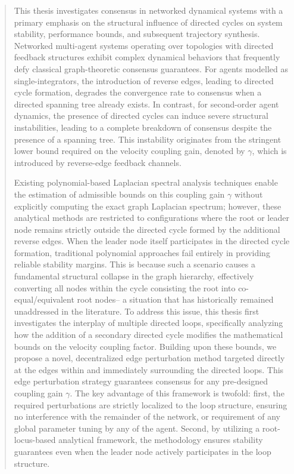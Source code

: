 \makedeclaration
\copyrightpage
\begin{abstract}
\raggedbottom
This thesis investigates consensus in networked dynamical systems with a primary emphasis on the structural influence of directed cycles on system stability, performance bounds, and subsequent trajectory synthesis. Networked multi-agent systems operating over topologies with directed feedback structures exhibit complex dynamical behaviors that frequently defy classical graph-theoretic consensus guarantees. For agents modelled as single-integrators, the introduction of reverse edges, leading to directed cycle formation, degrades the convergence rate to consensus when a directed spanning tree already exists. In contrast, for second-order agent dynamics, the presence of directed cycles can induce severe structural instabilities, leading to a complete breakdown of consensus despite the presence of a spanning tree. This instability originates from the stringent lower bound required on the velocity coupling gain, denoted by $\gamma$, which is introduced by reverse-edge feedback channels.

Existing polynomial-based Laplacian spectral analysis techniques enable the estimation of admissible bounds on this coupling gain $\gamma$ without explicitly computing the exact graph Laplacian spectrum; however, these analytical methods are restricted to configurations where the root or leader node remains strictly outside the directed cycle formed by the additional reverse edges. When the leader node itself participates in the directed cycle formation, traditional polynomial approaches fail entirely in providing reliable stability margins. This is because such a scenario causes a fundamental structural collapse in the graph hierarchy, effectively converting all nodes within the cycle consisting the root into co-equal/equivalent root nodes-- a situation that has historically remained unaddressed in the literature. To address this issue, this thesis first investigates the interplay of multiple directed loops, specifically analyzing how the addition of a secondary directed cycle modifies the mathematical bounds on the velocity coupling factor. Building upon these bounds, we propose a novel, decentralized edge perturbation method targeted directly at the edges within and immediately surrounding the directed loops. This edge perturbation strategy guarantees consensus for any pre-designed coupling gain $\gamma$. The key advantage of this framework is twofold: first, the required perturbations are strictly localized to the loop structure, ensuring no interference with the remainder of the network, or requirement of any global parameter tuning by any of the agent. Second, by utilizing a root-locus-based analytical framework, the methodology ensures stability guarantees even when the leader node actively participates in the loop structure.


\end{abstract}
